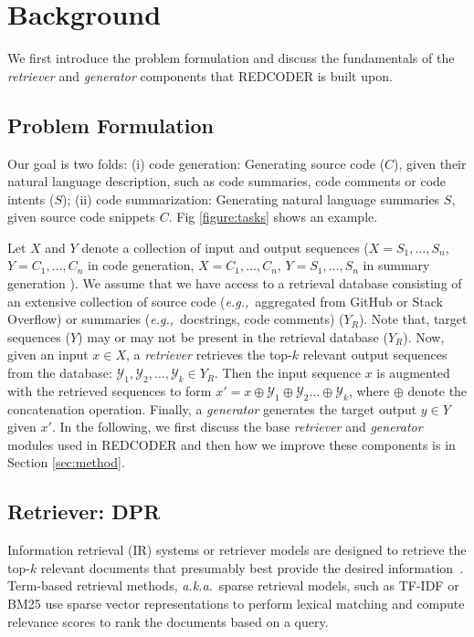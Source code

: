 \documentclass[11pt]{article}
\newcommand{\tool}{{REDCODER}\xspace}
\newcommand{\eg}{\textit{e.g.,}~}
\newcommand{\aka}{\textit{a.k.a.}~}
\begin{document}
 \section{Background}
\label{sec:background}
We first introduce the problem formulation and discuss the fundamentals of the {\em retriever} and {\em generator} components that \tool is built upon.

\subsection{Problem Formulation}
\label{sec:problem-formulation}
Our goal is two folds: (i) code generation: Generating source code ($C$), given their natural language description, such as code summaries, code comments or code intents ($S$); (ii) code summarization: Generating natural language summaries $S$, given source code snippets $C$. Fig \ref{figure:tasks} shows an example.



Let $X$ and $Y$ denote a collection of input and output sequences ($X = S_1, \ldots, S_n$, $Y = C_1, \ldots, C_n$ in code generation, $X = C_1, \ldots, C_n$, $Y = S_1, \ldots, S_n$ in summary generation
). 
We assume that we have access to a retrieval database consisting of an extensive collection of source code (\eg aggregated from GitHub or Stack Overflow) or summaries (\eg docstrings, code comments) ($Y_R$). Note that, target sequences ($Y$) may or may not be present in the retrieval database (${Y}_R$).
Now, given an input $x \in X$, a {\em retriever} retrieves the top-$k$ relevant output sequences from the database: $\mathcal{Y}_{1}, \mathcal{Y}_{2}, \ldots, \mathcal{Y}_{k} \in {Y}_R$.
Then the input sequence $x$ is augmented with the retrieved sequences to form $x' = x \oplus \mathcal{Y}_{1}  \oplus  \mathcal{Y}_{2}\ldots  \oplus \mathcal{Y}_{k}$, where $\oplus$ denote the concatenation operation.
Finally, a {\em generator} generates the target output $y \in Y$ given $x'$.
In the following, we first discuss the base {\em retriever} and {\em generator} modules used in \tool and then how we improve these components is in Section \ref{sec:method}. 



\subsection{Retriever: DPR}
\label{sec:background-retriever}
Information retrieval (IR) systems or retriever models
are designed to retrieve the top-$k$ relevant documents that presumably best provide the desired information~\cite{manning2008xml}. 
Term-based retrieval methods, \aka sparse retrieval models, such as TF-IDF or BM25 \cite{robertson2009probabilistic} 
use sparse vector representations to perform lexical matching and compute relevance scores to rank the documents based on a query.
\end{document}

